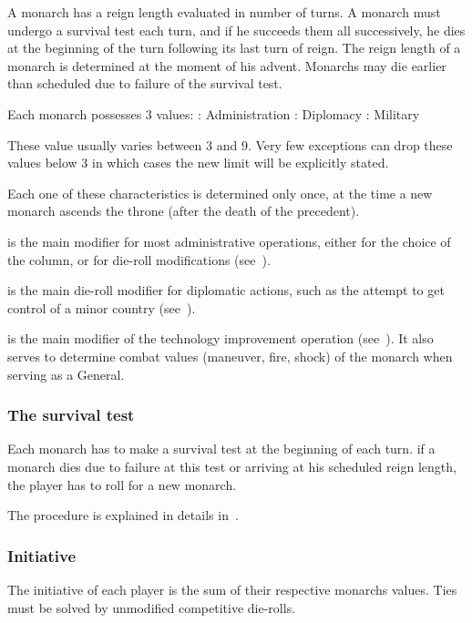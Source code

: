  A monarch has a reign length evaluated in number of
turns. A monarch must undergo a survival test each turn, and if he succeeds
them all successively, he dies at the beginning of the turn following its last
turn of reign. The reign length of a monarch is determined at the moment of
his advent.%
\bparag Monarchs may die earlier than scheduled due to failure of the survival
test.

 Each monarch possesses 3 values:
\bparag \ADM: Administration
\bparag \DIP: Diplomacy
\bparag \MIL: Military

\aparag These value usually varies between 3 and 9. Very few exceptions can
drop these values below 3 in which cases the new limit will be explicitly
stated.

\aparag Each one of these characteristics is determined only once, at the time
a new monarch ascends the throne (after the death of the precedent).

 \ADM is the main modifier for most
administrative operations, either for the choice of the column, or for
die-roll modifications (see~).

 \DIP is the main die-roll modifier for diplomatic
actions, such as the attempt to get control of a minor country
(see~).

 \MIL is the main modifier of the technology
improvement operation (see~). It
also serves to determine combat values (maneuver, fire, shock) of the monarch
when serving as a General.


\subsubsection{The survival test}
\aparag Each monarch has to make a survival test at the beginning of each
turn.
\bparag if a monarch dies due to failure at this test or arriving at his
scheduled reign length, the player has to roll for a new monarch.

\aparag The procedure is explained in details in~.


\subsubsection{Initiative}
\aparag The initiative of each player is the sum of their respective monarchs
values.
\bparag Ties must be solved by unmodified competitive die-rolls.

